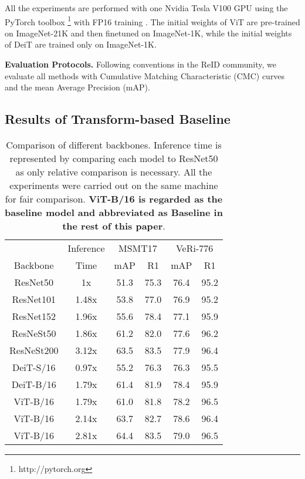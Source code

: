 \documentclass[10pt,twocolumn,letterpaper]{article}
\begin{document}
All the experiments are performed with one Nvidia Tesla V100 GPU using the PyTorch toolbox \footnote{http://pytorch.org} with FP16 training . The initial weights of ViT are pre-trained on ImageNet-21K and then finetuned on ImageNet-1K, while the initial weights of DeiT are trained only on ImageNet-1K.

\textbf{Evaluation Protocols.} Following conventions in the ReID community, we evaluate all methods with Cumulative Matching Characteristic (CMC) curves and the mean Average Precision (mAP).


\subsection{Results of Transform-based Baseline}

\renewcommand{\multirowsetup}{\centering}
\begin{table}[t]
\footnotesize
    \begin{center}
    \begin{tabular}{ cc|cc|cc}
    \hline
    & Inference& \multicolumn{2}{c|}{MSMT17} & \multicolumn{2}{c}{VeRi-776} \\
    Backbone      & Time  & mAP    & R1  & mAP & R1  \\
    \hline
    \hline
    ResNet50    & 1x      &   51.3    & 75.3  &  76.4 & 95.2 \\
    ResNet101   & 1.48x   &   53.8    & 77.0  &  76.9 & 95.2 \\
    ResNet152   & 1.96x   &   55.6    & 78.4  &  77.1 & 95.9 \\
    ResNeSt50   & 1.86x   &   61.2    & 82.0  &  77.6 & 96.2 \\
    ResNeSt200  & 3.12x   &   63.5    & 83.5  &  77.9 & 96.4 \\
    \hline
    DeiT-S/16    & 0.97x   &   55.2    & 76.3  & 76.3  & 95.5 \\
    DeiT-B/16    & 1.79x   &    61.4  &  81.9 & 78.4  & 95.9  \\
    ViT-B/16     & 1.79x   &   61.0    & 81.8  &  78.2 & 96.5 \\
    ViT-B/16 & 2.14x   &   63.7    & 82.7  &  78.6 & 96.4\\
    ViT-B/16 & 2.81x   &   64.4    & 83.5  &  79.0 & 96.5 \\
    \hline
    \end{tabular}
    \end{center}
\caption{\label{tab:vit-bot} Comparison of different backbones. Inference time is represented by comparing each model to ResNet50 as only relative comparison is necessary. All the experiments were carried out on the same machine for fair comparison. \textbf{ViT-B/16 is regarded as the baseline model and abbreviated as Baseline in the rest of this paper}.}
\end{table}
\end{document}
